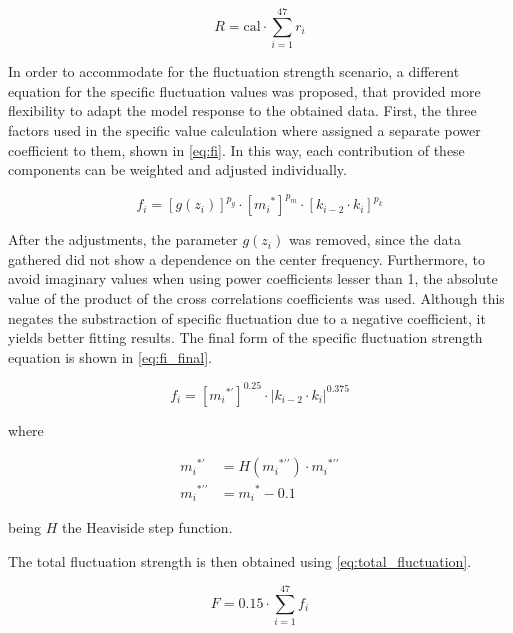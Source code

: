 \documentclass[../main.tex]{subfiles}
\begin{document}
\begin{modelchapter}
\begin{equation}
  R = \text{cal} \cdot \displaystyle\sum_{i=1}^{47} r_i
  \label{eq:total_roughness}
\end{equation}

In order to accommodate for the fluctuation strength scenario, a different
equation for the specific fluctuation values was proposed, that provided more
flexibility to adapt the model response to the obtained data. First, the three
factors used in the specific value calculation where assigned a separate power
coefficient to them, shown in \cref{eq:fi}. In this way, each contribution of
these components can be weighted and adjusted individually.

\begin{equation}
  f_i = [g(z_i)]^{p_g} \cdot [{m_i}^*]^{p_m} \cdot [k_{i-2} \cdot k_i]^{p_k}
  \label{eq:fi}
\end{equation}

After the adjustments, the parameter $g(z_i)$ was removed, since the data
gathered did not show a dependence on the center frequency. Furthermore, to
avoid imaginary values when using power coefficients lesser than 1, the absolute
value of the product of the cross correlations coefficients was used. Although
this negates the substraction of specific fluctuation due to a negative
coefficient, it yields better fitting results. The final form of the specific
fluctuation strength equation is shown in \cref{eq:fi_final}.

\begin{equation}
  f_i = [{m_i}^{*\prime}]^{0.25} \cdot |k_{i-2} \cdot k_i|^{0.375}
  \label{eq:fi_final}
\end{equation}

where

\begin{align}
  {m_i}^{*\prime} &= H({m_i}^{*\prime\prime}) \cdot {m_i}^{*\prime\prime}
  \label{eq:md_transformation_1} \\
  {m_i}^{*\prime\prime} &= {m_i}^* - 0.1
  \label{eq:md_transformation_2}
\end{align}

being $H$ the Heaviside step function.

The total fluctuation strength is then obtained using
\cref{eq:total_fluctuation}.

\begin{equation}
  F = 0.15 \cdot \displaystyle\sum_{i=1}^{47} f_i
  \label{eq:total_fluctuation}
\end{equation}


\end{modelchapter}
\end{document}
